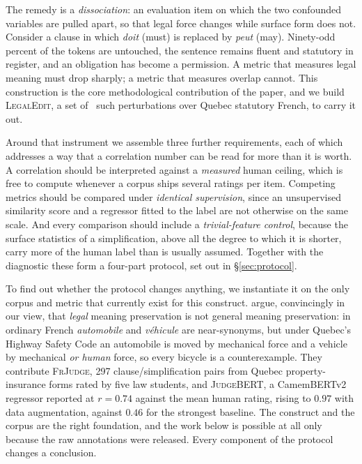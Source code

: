 \documentclass[11pt]{article}
\begin{document}
The remedy is a \emph{dissociation}: an evaluation item on which the two
confounded variables are pulled apart, so that legal force changes while surface
form does not. Consider a clause in which \emph{doit} (must) is replaced by
\emph{peut} (may). Ninety-odd percent of the tokens are untouched, the sentence
remains fluent and statutory in register, and an obligation has become a
permission. A metric that measures legal meaning must drop sharply; a metric
that measures overlap cannot. This construction is the core methodological
contribution of the paper, and we build \textsc{LegalEdit}, a set of \numedits\
such perturbations over Quebec statutory French, to carry it out.

Around that instrument we assemble three further requirements, each of which
addresses a way that a correlation number can be read for more than it is worth.
A correlation should be interpreted against a \emph{measured} human ceiling,
which is free to compute whenever a corpus ships several ratings per item.
Competing metrics should be compared under \emph{identical supervision}, since
an unsupervised similarity score and a regressor fitted to the label are not
otherwise on the same scale. And every comparison should include a
\emph{trivial-feature control}, because the surface statistics of a
simplification, above all the degree to which it is shorter, carry more of the
human label than is usually assumed. Together with the diagnostic these form a
four-part protocol, set out in \S\ref{sec:protocol}.

To find out whether the protocol changes anything, we instantiate it on the only
corpus and metric that currently exist for this construct.
\citet{beauchemin2025judgebert} argue, convincingly in our view, that
\emph{legal} meaning preservation is not general meaning preservation: in
ordinary French \emph{automobile} and \emph{v\'ehicule} are near-synonyms, but
under Quebec's Highway Safety Code an automobile is moved by mechanical force
and a vehicle by mechanical \emph{or human} force, so every bicycle is a
counterexample. They contribute \textsc{FrJudge}, 297 clause/simplification
pairs from Quebec property-insurance forms rated by five law students, and
\textsc{JudgeBERT}, a CamemBERTv2 regressor reported at $r=0.74$ against the
mean human rating, rising to $0.97$ with data augmentation, against $0.46$ for
the strongest baseline. The construct and the corpus are the right foundation,
and the work below is possible at all only because the raw annotations were
released. Every component of the protocol changes a conclusion.
\end{document}
